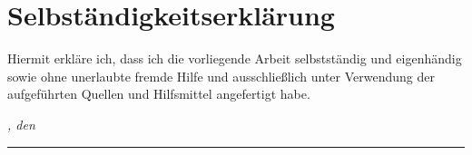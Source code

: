 %
\chapter*{Selbst\"andigkeitserkl\"arung}
\label{sec:declaration}
\thispagestyle{empty}

Hiermit erkl\"are ich, dass ich die vorliegende Arbeit selbstst\"andig und eigenh\"andig sowie ohne
unerlaubte fremde Hilfe und ausschlie\ss{}lich unter Verwendung der aufgef\"uhrten Quellen und
Hilfsmittel angefertigt habe.

\bigskip

\noindent\textit{\thesisUniversityCity, den \thesisDateGerman}

\smallskip

\begin{flushright}
	\begin{minipage}{5cm}
		\rule{\textwidth}{1pt}
		\centering\thesisName
	\end{minipage}
\end{flushright}

